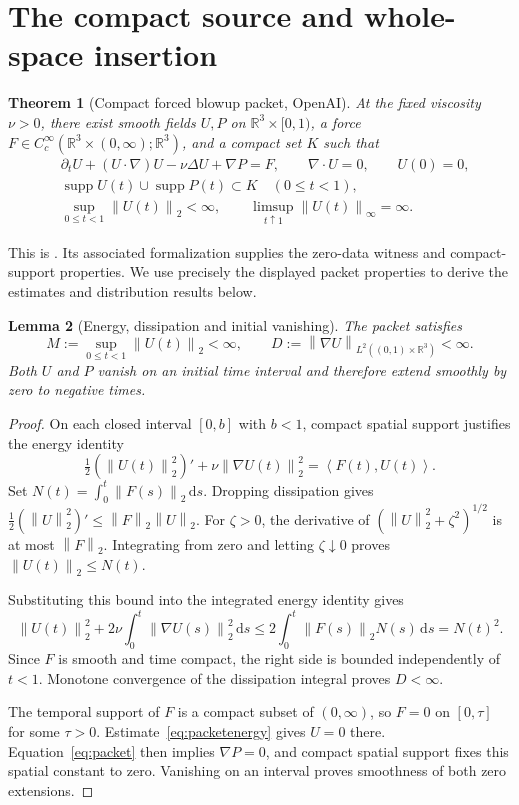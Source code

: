 \documentclass[11pt,a4paper]{article}
\newtheorem{theorem}{Theorem}[section]
\newtheorem{lemma}[theorem]{Lemma}
\theoremstyle{definition}\newtheorem{definition}[theorem]{Definition}
\theoremstyle{remark}\newtheorem{remark}[theorem]{Remark}
\newcommand{\R}{\mathbb R}\newcommand{\TT}{\mathbb T^3}
\newcommand{\dd}{\,\mathrm d}\newcommand{\eps}{\varepsilon}
\newcommand{\norm}[1]{\left\lVert#1\right\rVert}
\newcommand{\ip}[2]{\left\langle#1,#2\right\rangle}
\DeclareMathOperator{\supp}{supp}
\begin{document}
\section{The compact source and whole-space insertion}
\begin{theorem}[Compact forced blowup packet, OpenAI]\label{thm:packet}
At the fixed viscosity $\nu>0$, there exist smooth fields $U,P$ on
$\R^3\times[0,1)$, a force
$F\in C_c^\infty(\R^3\times(0,\infty);\R^3)$, and a compact set $K$ such that
\begin{align}
 &\partial_tU+(U\cdot\nabla)U-\nu\Delta U+\nabla P=F,\qquad
 \nabla\cdot U=0,\qquad U(0)=0,\label{eq:packet}\\
 &\supp U(t)\cup\supp P(t)\subset K\quad(0\le t<1),\nonumber\\
 &\sup_{0\le t<1}\norm{U(t)}_2<\infty,\qquad
 \limsup_{t\uparrow1}\norm{U(t)}_\infty=\infty.\label{eq:packetblowup}
\end{align}
\end{theorem}
This is \cite[Theorem 1.1]{openai}. Its associated formalization \cite{lean} supplies the zero-data witness and compact-support properties. We use precisely the displayed packet properties to derive the estimates and distribution results below.

\begin{lemma}[Energy, dissipation and initial vanishing]\label{lem:packetenergy}
The packet satisfies
\[
 M:=\sup_{0\le t<1}\norm{U(t)}_2<\infty,\qquad
 D:=\norm{\nabla U}_{L^2((0,1)\times\R^3)}<\infty.
\]
Both $U$ and $P$ vanish on an initial time interval and therefore extend smoothly by zero to negative times.
\end{lemma}
\begin{proof}
On each closed interval $[0,b]$ with $b<1$, compact spatial support justifies the energy identity
\[
 \tfrac12(\norm{U(t)}_2^2)'
 +\nu\norm{\nabla U(t)}_2^2=\ip{F(t)}{U(t)}.
\]
Set $N(t)=\int_0^t\norm{F(s)}_2\dd s$. Dropping dissipation gives
$\tfrac12(\norm{U}_2^2)'\le\norm{F}_2\norm{U}_2$.
For $\zeta>0$, the derivative of $(\norm{U}_2^2+\zeta^2)^{1/2}$ is at most $\norm{F}_2$. Integrating from zero and letting $\zeta\downarrow0$ proves $\norm{U(t)}_2\le N(t)$.

Substituting this bound into the integrated energy identity gives
\begin{equation}\label{eq:packetenergy}
 \norm{U(t)}_2^2+2\nu\int_0^t\norm{\nabla U(s)}_2^2\dd s
 \le 2\int_0^t\norm{F(s)}_2N(s)\dd s=N(t)^2.
\end{equation}
Since $F$ is smooth and time compact, the right side is bounded independently of $t<1$. Monotone convergence of the dissipation integral proves $D<\infty$.

The temporal support of $F$ is a compact subset of $(0,\infty)$, so $F=0$ on $[0,\tau]$ for some $\tau>0$. Estimate~\eqref{eq:packetenergy} gives $U=0$ there. Equation~\eqref{eq:packet} then implies $\nabla P=0$, and compact spatial support fixes this spatial constant to zero. Vanishing on an interval proves smoothness of both zero extensions.
\end{proof}
\end{document}
